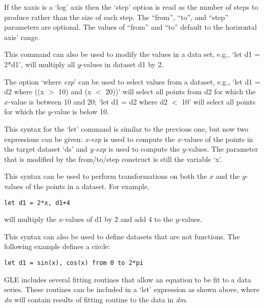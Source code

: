 \begin{commanddescription}
If the xaxis is a `log' axis then the `step' option is read as the number of steps to produce rather than the size of each step. The ``from'', ``to'', and ``step'' parameters are optional. The values of ``from'' and ``to'' default to the horizontal axis' range.

This command can also be used to modify the values in a data set, e.g., `let d1 = 2*d1', will multiply all $y$-values in dataset d1 by 2.

The option `where {\it exp}' can be used to select values from a dataset, e.g., `let d1 = d2 where ((x $>$ 10) and (x $<$ 20))' will select all points from d2 for which the $x$-value is between 10 and 20; `let d1 = d2 where d2 $<$ 10' will select all points for which the $y$-value is below 10.

\item[{\sf let ds = {\it x-exp, y-exp {\sf [from} low{\sf] [to} high{\sf] [step} exp{\sf] [where} exp{\sf]}}}]

This syntax for the `let' command is similar to the previous one, but now two expressions can be given: {\it x-exp} is used to compute the $x$-values of the points in the target dataset `ds' and {\it y-exp} is used to compute the $y$-values. The parameter that is modified by the from/to/step construct is still the variable `x'.

This syntax can be used to perform transformations on both the $x$ and the $y$-values of the points in a dataset. For example,

\begin{Verbatim}
let d1 = 2*x, d1+4
\end{Verbatim}

will multiply the $x$-values of d1 by 2 and add 4 to the $y$-values. 

This syntax can also be used to define datasets that are not functions. The following example defines a circle:

\begin{Verbatim}
let d1 = sin(x), cos(x) from 0 to 2*pi
\end{Verbatim}

\item[{\sf let {\it dn} = [routine] {\it dm} [options] [{\it slopevar}] [{\it offsetvar}] [{\it rsqvar}]}]

GLE includes several fitting routines that allow an equation to be fit to a data series. These routines can be included in a `let' expression as shown above, where {\it dn} will contain results of fitting {\sf routine} to the data in {\it dm}.


\end{commanddescription}
